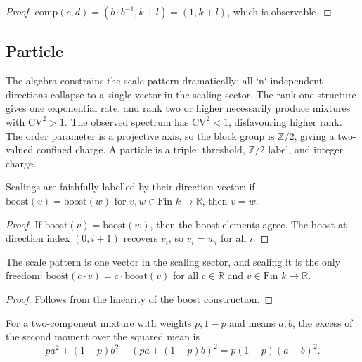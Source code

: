 \begin{proof}
$\mathrm{comp}(c, d) = (b \cdot b^{-1}, k + l) = (1, k+l)$, which is observable.
\end{proof}

\subsection{Particle}

The algebra constrains the scale pattern dramatically: all `n` independent directions collapse to a single vector in the scaling sector. The rank-one structure gives one exponential rate, and rank two or higher necessarily produce mixtures with $\mathrm{CV}^2 > 1$. The observed spectrum has $\mathrm{CV}^2 < 1$, disfavouring higher rank. The order parameter is a projective axis, so the block group is $\mathbb{Z}/2$, giving a two-valued confined charge. A particle is a triple: threshold, $\mathbb{Z}/2$ label, and integer charge.

\begin{theorem}
Scalings are faithfully labelled by their direction vector: if $\mathrm{boost}(v) = \mathrm{boost}(w)$ for $v, w \in \text{Fin } k \to \mathbb{R}$, then $v = w$.
\end{theorem}

\begin{proof}
If $\mathrm{boost}(v) = \mathrm{boost}(w)$, then the boost elements agree. The boost at direction index $(0, i+1)$ recovers $v_i$, so $v_i = w_i$ for all $i$.
\end{proof}

\begin{theorem}
The scale pattern is one vector in the scaling sector, and scaling it is the only freedom: $\mathrm{boost}(c \cdot v) = c \cdot \mathrm{boost}(v)$ for all $c \in \mathbb{R}$ and $v \in \text{Fin } k \to \mathbb{R}$.
\end{theorem}

\begin{proof}
Follows from the linearity of the boost construction.
\end{proof}

\begin{theorem}
For a two-component mixture with weights $p, 1-p$ and means $a, b$, the excess of the second moment over the squared mean is
\[ p a^2 + (1-p)b^2 - (pa + (1-p)b)^2 = p(1-p)(a-b)^2. \]
\end{theorem}


